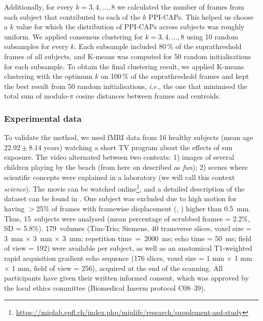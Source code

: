 Additionally, for every $k = {3,4,...,8}$ we calculated the number of frames from each subject that contributed to each of the $k$ PPI-CAPs.
This helped us choose a $k$ value for which the distribution of PPI-CAPs across subjects was roughly uniform. We applied consensus clustering for $k = {3,4,...,8}$ using 10 random subsamples for every $k$. Each subsample included 80\,\% of the suprathreshold frames of all subjects, and K-means was computed for 50 random initialisations for each subsample.
To obtain the final clustering result, we applied K-means clustering with the optimum $k$ on 100\,\% of the suprathreshold frames and kept the best result from 50  random initialisations, \textit{i.e.}, the one that minimised the total sum of modulo-$\pi$ cosine distances between frames and centroids.

\subsubsection{Experimental data}

To validate the method, we used fMRI data from 16 healthy subjects (mean age $22.92 \pm 8.14$ years) watching a short TV program about the effects of sun exposure. The video alternated between two contexts: 1) images of several children playing by the beach (from here on described as \textit{fun}); 2) scenes where scientific concepts were explained in a laboratory (we will call this context \textit{science}). The movie can be watched online\footnote{\url{https://miplab.epfl.ch/index.php/miplife/research/supplement-asd-study}}, and a detailed description of the dataset can be found in \cite{Jochaut2015}. One subject was excluded due to high motion for having $>$25\% of frames with framewise displacement (\citeauthor{Power2010}, \citeyear{Power2010}) higher than 0.5~mm. Thus, 15~subjects were analysed (mean percentage of scrubbed frames = 2.2\%, SD = 5.8\%). 179~volumes (Tim-Trio; Siemens, 40 transverse slices, voxel size = 3~mm $\times$ 3~mm $\times$ 3~mm; repetition time~=~2000~ms; echo time = 50~ms; field of view = 192) were available per subject, as well as an anatomical T1-weighted rapid acquisition gradient echo sequence (176 slices, voxel size = 1 mm $\times$ 1 mm $\times$ 1 mm, field of view = 256), acquired at the end of the scanning. All participants have given their written informed consent, which was approved by the local ethics committee (Biomedical Inserm protocol C08–39).

